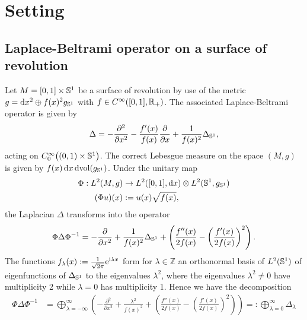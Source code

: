 \section{Setting}

\subsection{Laplace-Beltrami operator on a surface of revolution}
Let $M = [0,1]\times\Sphere{1}$ be a surface of revolution by use of the metric
$g = \mathrm dx^2 \oplus f(x)^2 g_\Sphere{1}$ with $f\in \Cinf([0,1],
\Rplus)$. The associated Laplace-Beltrami operator is given by
\begin{align}
  \Delta = -\frac{\partial^2}{\partial x^2} -
            \frac{f'(x)}{f(x)}\frac{\partial}{\partial x} +
            \frac{1}{f(x)^2}\Delta_\Sphere1,
\end{align}
acting on $\Cinf[0]\bigl((0,1)\times\Sphere1\bigr)$. The correct Lebesgue
measure on the space $(M,g)$ is given by $f(x)\,\mathrm dx\, \mathrm
d\!\vol(g_\Sphere1)$. Under the unitary map
\begin{align*}
  \Phi: L^2(M, g)&\to L^2([0,1], \mathrm dx)\otimes L^2(\Sphere1, g_\Sphere1) \\
     (\Phi u)(x) &:= u(x) \sqrt{f(x)},
\end{align*}
the Laplacian $\Delta$ transforms into the operator
\begin{align*}
  \Phi\Delta\Phi^{-1} = -\frac{\partial}{\partial x^2} +
  \frac{1}{f(x)^2}\Delta_\Sphere1 + \left( \frac{f''(x)}{2f(x)} -
  \left(\frac{f'(x)}{2f(x)}\right)^2\right).
\end{align*}
The functions $f_\lambda(x) := \frac{1}{\sqrt{2\pi}}\Eto{\mathrm i\lambda x}$
form for $\lambda\in\mathbb{Z}$ an orthonormal basis of $L^2(\Sphere1)$ of
eigenfunctions of $\Delta_\Sphere1$ to the eigenvalues $\lambda^2$, where the
eigenvalues $\lambda^2 \neq 0$ have multiplicity 2 while $\lambda = 0$ has
multiplicity 1. Hence we have the decomposition
\begin{align}
  \label{eqn:lpl-decomp}
  \Phi\Delta\Phi^{-1} &= \bigoplus_{\lambda=-\infty}^{\infty} \left(
    -\frac{\partial^2}{\partial x^2} + \frac{\lambda^2}{f(x)^2} + 
     \left( \frac{f''(x)}{2f(x)} -
     \left(\frac{f'(x)}{2f(x)}\right)^2\right)\right)
     =: \bigoplus_{\lambda=0}^{\infty}\Delta_\lambda
\end{align}
